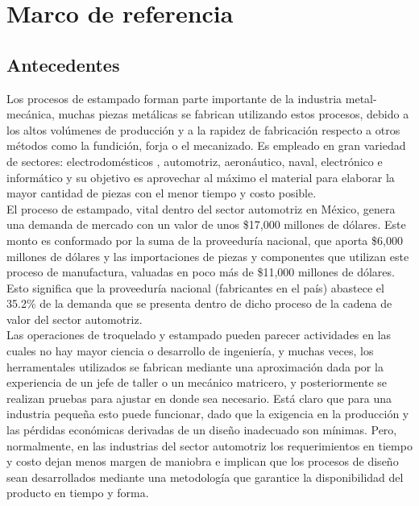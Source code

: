 \chapter{Marco de referencia}\label{ch:marco_de_referencia}

\section{Antecedentes}

Los procesos de estampado forman  parte importante de la industria metal-mecánica, muchas 
piezas metálicas se fabrican utilizando estos procesos, debido a los altos volúmenes de 
producción y a la rapidez de fabricación respecto a otros métodos como la fundición, forja 
o el mecanizado. Es empleado en gran variedad de sectores: electrodomésticos ,
automotriz, aeronáutico, naval, electrónico e informático y su objetivo es aprovechar al máximo 
el material para elaborar la mayor cantidad de piezas con el menor tiempo y costo posible. \\

El proceso de estampado, vital dentro del sector automotriz en México, genera una demanda 
de mercado con un valor de unos \$17,000 millones de dólares. Este monto es conformado por la 
suma de la proveeduría nacional, que aporta \$6,000 millones de dólares y las importaciones de 
piezas y componentes que utilizan este proceso de manufactura, valuadas en poco más de 
\$11,000 millones de dólares. Esto significa que la proveeduría nacional (fabricantes en el país) 
abastece el 35.2\% de la demanda que se presenta dentro de dicho proceso de la cadena de valor 
del sector automotriz. ~\cite{elhorizonte} \\

Las operaciones de troquelado y estampado pueden parecer actividades en las cuales no hay mayor 
ciencia o desarrollo de ingeniería, y muchas veces, los herramentales utilizados 
se fabrican mediante una aproximación dada por la experiencia de un jefe de taller o un 
mecánico matricero, y posteriormente se realizan pruebas para ajustar en donde sea necesario.
Está claro que para una industria pequeña esto puede funcionar, dado que la exigencia 
en la producción y las pérdidas económicas derivadas de un diseño inadecuado son mínimas. 
Pero, normalmente, en las industrias del sector automotriz los requerimientos en tiempo y 
costo dejan menos margen de maniobra e implican que los procesos de diseño sean desarrollados 
mediante una metodología que garantice la disponibilidad del producto en tiempo y forma.\\

